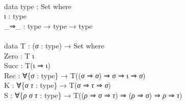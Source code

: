 \documentclass{entcs} \usepackage{prentcsmacro}
\newcommand{\AgdaFontStyle}[1]{\textsf{#1}}
\newcommand{\AgdaBoundFontStyle}[1]{\textit{#1}}
\newcommand{\AgdaKeyword}     [1]
    {\AgdaFontStyle{\textcolor{AgdaKeyword}{#1}}}
\newcommand{\AgdaSymbol}      [1]{\textcolor{AgdaSymbol}{#1}}
\newcommand{\AgdaPrimitiveType}[1]
    {\AgdaFontStyle{\textcolor{AgdaPrimitiveType}{#1}}}
\newcommand{\AgdaBound}    [1]{\AgdaBoundFontStyle{\textcolor{AgdaBound}{#1}}}
\newcommand{\AgdaInductiveConstructor}[1]
    {\AgdaFontStyle{\textcolor{AgdaInductiveConstructor}{#1}}}
\newcommand{\AgdaDatatype} [1]{\AgdaFontStyle{\textcolor{AgdaDatatype}{#1}}}
\newcommand{\AgdaIndent}[1]{\quad}
\newcommand{\AgdaCodeStyle}{\small}
\newenvironment{code}%
{\noindent\AgdaCodeStyle\pboxed}%
{\endpboxed\par\noindent%
\ignorespacesafterend}
\begin{document}
\begin{code}\>\<%
\\
\>\AgdaKeyword{data} \AgdaDatatype{type} \AgdaSymbol{:} \AgdaPrimitiveType{Set} \AgdaKeyword{where}\<%
\\
\>[0]\AgdaIndent{2}{}\<[2]%
\>[2]\AgdaInductiveConstructor{ι} \<[13]%
\>[13]\AgdaSymbol{:} \AgdaDatatype{type}\<%
\\
\>[0]\AgdaIndent{2}{}\<[2]%
\>[2]\AgdaInductiveConstructor{\_⇒\_} \AgdaSymbol{:} \AgdaDatatype{type} \AgdaSymbol{→} \AgdaDatatype{type} \AgdaSymbol{→} \AgdaDatatype{type}\<%
\\
%
\\
\>\AgdaKeyword{data} \AgdaDatatype{T} \AgdaSymbol{:} \AgdaSymbol{(}\AgdaBound{σ} \AgdaSymbol{:} \AgdaDatatype{type}\AgdaSymbol{)} \AgdaSymbol{→} \AgdaPrimitiveType{Set} \AgdaKeyword{where}\<%
\\
\>[0]\AgdaIndent{2}{}\<[2]%
\>[2]\AgdaInductiveConstructor{Zero} \<[9]%
\>[9]\AgdaSymbol{:} \AgdaDatatype{T} \AgdaInductiveConstructor{ι}\<%
\\
\>[0]\AgdaIndent{2}{}\<[2]%
\>[2]\AgdaInductiveConstructor{Succ} \<[9]%
\>[9]\AgdaSymbol{:} \AgdaDatatype{T}\AgdaSymbol{(}\AgdaInductiveConstructor{ι} \AgdaInductiveConstructor{⇒} \AgdaInductiveConstructor{ι}\AgdaSymbol{)}\<%
\\
\>[0]\AgdaIndent{2}{}\<[2]%
\>[2]\AgdaInductiveConstructor{Rec} \<[7]%
\>[7]\AgdaSymbol{:} \AgdaSymbol{∀\{}\AgdaBound{σ} \AgdaSymbol{:} \AgdaDatatype{type}\AgdaSymbol{\}} \<[25]%
\>[25]\AgdaSymbol{→} \AgdaDatatype{T}\AgdaSymbol{((}\AgdaBound{σ} \AgdaInductiveConstructor{⇒} \AgdaBound{σ}\AgdaSymbol{)} \AgdaInductiveConstructor{⇒} \AgdaBound{σ} \AgdaInductiveConstructor{⇒} \AgdaInductiveConstructor{ι} \AgdaInductiveConstructor{⇒} \AgdaBound{σ}\AgdaSymbol{)}\<%
\\
\>[0]\AgdaIndent{2}{}\<[2]%
\>[2]\AgdaInductiveConstructor{K} \<[7]%
\>[7]\AgdaSymbol{:} \AgdaSymbol{∀\{}\AgdaBound{σ} \AgdaBound{τ} \AgdaSymbol{:} \AgdaDatatype{type}\AgdaSymbol{\}} \<[25]%
\>[25]\AgdaSymbol{→} \AgdaDatatype{T}\AgdaSymbol{(}\AgdaBound{σ} \AgdaInductiveConstructor{⇒} \AgdaBound{τ} \AgdaInductiveConstructor{⇒} \AgdaBound{σ}\AgdaSymbol{)}\<%
\\
\>[0]\AgdaIndent{2}{}\<[2]%
\>[2]\AgdaInductiveConstructor{S} \<[7]%
\>[7]\AgdaSymbol{:} \AgdaSymbol{∀\{}\AgdaBound{ρ} \AgdaBound{σ} \AgdaBound{τ} \AgdaSymbol{:} \AgdaDatatype{type}\AgdaSymbol{\}} \AgdaSymbol{→} \AgdaDatatype{T}\AgdaSymbol{((}\AgdaBound{ρ} \AgdaInductiveConstructor{⇒} \AgdaBound{σ} \AgdaInductiveConstructor{⇒} \AgdaBound{τ}\AgdaSymbol{)} \AgdaInductiveConstructor{⇒} \AgdaSymbol{(}\AgdaBound{ρ} \AgdaInductiveConstructor{⇒} \AgdaBound{σ}\AgdaSymbol{)} \AgdaInductiveConstructor{⇒} \AgdaBound{ρ} \AgdaInductiveConstructor{⇒} \AgdaBound{τ}\AgdaSymbol{)}\<%

\end{code}
\end{document}
